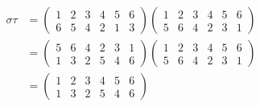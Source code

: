 \begin{solution}
    \begin{equation*}
        \begin{aligned}
            \sigma\tau
            &=
            \begin{pmatrix}
                1 & 2 & 3 & 4 & 5 & 6 \\
                6 & 5 & 4 & 2 & 1 & 3
            \end{pmatrix}\begin{pmatrix}
                1 & 2 & 3 & 4 & 5 & 6 \\
                5 & 6 & 4 & 2 & 3 & 1
            \end{pmatrix}\\
            &=
            \begin{pmatrix}
                5 & 6 & 4 & 2 & 3 & 1 \\
                1 & 3 & 2 & 5 & 4 & 6
            \end{pmatrix}\begin{pmatrix}
                1 & 2 & 3 & 4 & 5 & 6 \\
                5 & 6 & 4 & 2 & 3 & 1
            \end{pmatrix}\\
            &=
            \begin{pmatrix}
                1 & 2 & 3 & 4 & 5 & 6 \\
                1 & 3 & 2 & 5 & 4 & 6
            \end{pmatrix}
        \end{aligned}
    \end{equation*}


\end{solution}
